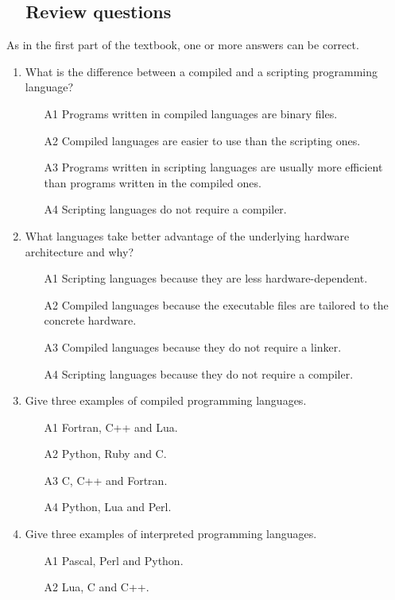 \subsection{\ \ Review questions}

As in the first part of the textbook, one or more answers can be correct. 
\begin{enumerate}
\item What is the difference between a compiled and a scripting programming language?
\begin{enumerate}
\item[A1] Programs written in compiled languages are binary files. 
\item[A2] Compiled languages are easier to use than the scripting ones.
\item[A3] Programs written in scripting languages are usually more efficient than programs 
          written in the compiled ones.
\item[A4] Scripting languages do not require a compiler.
\end{enumerate}
\item What languages take better advantage of the underlying hardware architecture
      and why?
\begin{enumerate}
\item[A1] Scripting languages because they are less hardware-dependent.
\item[A2] Compiled languages because the executable files are tailored 
          to the concrete hardware.
\item[A3] Compiled languages because they do not require a linker.
\item[A4] Scripting languages because they do not require a compiler.
\end{enumerate}
\item Give three examples of compiled programming languages.
\begin{enumerate}
\item[A1] Fortran, C++ and Lua.
\item[A2] Python, Ruby and C.
\item[A3] C, C++ and Fortran.
\item[A4] Python, Lua and Perl.
\end{enumerate}
\item Give three examples of interpreted programming languages.
\begin{enumerate}
\item[A1] Pascal, Perl and Python.
\item[A2] Lua, C and C++.

\end{enumerate}
\end{enumerate}
